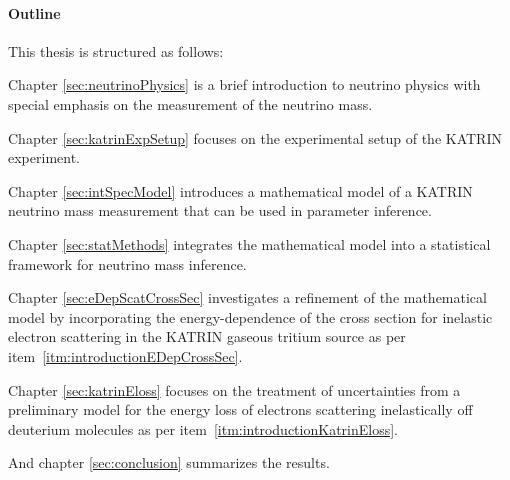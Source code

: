 \paragraph{Outline}
This thesis is structured as follows:

Chapter \ref{sec:neutrinoPhysics} is a brief introduction to neutrino physics with special emphasis on the measurement of the neutrino mass.

Chapter \ref{sec:katrinExpSetup} focuses on the experimental setup of the KATRIN experiment.

Chapter \ref{sec:intSpecModel} introduces a mathematical model of a KATRIN neutrino mass measurement that can be used in parameter inference.

Chapter \ref{sec:statMethods} integrates the mathematical model into a statistical framework for neutrino mass inference.

Chapter \ref{sec:eDepScatCrossSec} investigates a refinement of the mathematical model by incorporating the energy-dependence of the cross section for inelastic electron scattering in the KATRIN gaseous tritium source as per item~\ref{itm:introductionEDepCrossSec}.

Chapter \ref{sec:katrinEloss} focuses on the treatment of uncertainties from a preliminary model for the energy loss of electrons scattering inelastically off deuterium molecules as per item~\ref{itm:introductionKatrinEloss}.

And chapter \ref{sec:conclusion} summarizes the results.